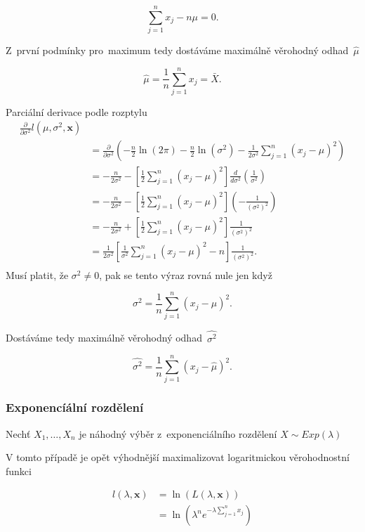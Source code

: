 \documentclass[thesis=B,czech]{FITthesis}[2012/06/26]
\begin{document}
$$\sum^{n}_{j=1}x_{j}-n\mu = 0.$$

\noindent Z~první podmínky pro~maximum tedy dostáváme maximálně věrohodný odhad~$\hat{\mu}$

$$\hat{\mu}=\frac{1}{n}\sum^n_{j=1}x_{j}=\bar{X}.$$

\noindent Parciální derivace podle rozptylu
\begin{align*}
\frac{\partial }{\partial \sigma^2}l(\mu,\sigma^2,\boldsymbol{x})\\
&=\frac{\partial }{\partial \sigma^2}
(-\frac{n}{2}\ln(2\pi)-\frac{n}{2}\ln(\sigma^2)-\frac{1}{2\sigma^2}
\sum^{n}_{j=1}(x_{j}-\mu)^2)\\
&= -\frac{n}{2\sigma^2}- \left [ \frac{1}{2}\sum^{n}_{j=1}(x_{j}-\mu)^2 \right ] \frac{d}{d \sigma^2} \left (\frac{1}{\sigma^2} \right )\\
&= -\frac{n}{2\sigma^2}- \left [ \frac{1}{2}\sum^{n}_{j=1}(x_{j}-\mu)^2 \right ] \left (- \frac{1}{(\sigma^2)^2} \right )\\
&=-\frac{n}{2\sigma^2}+
\left [ \frac{1}{2}\sum^{n}_{j=1}(x_{j}-\mu)^2 \right ]
\frac{1}{(\sigma^2)^2}\\
&=\frac{1}{2\sigma^2}
\left [ \frac{1}{\sigma^2}\sum^{n}_{j=1}(x_{j}-\mu)^2-n \right ]
\frac{1}{(\sigma^2)^2}.\\
\end{align*}
\noindent Musí platit, že $\sigma^2\neq0$, pak se tento výraz rovná nule jen když

$$\sigma^2=\frac{1}{n}\sum^{n}_{j=1}(x_{j}-\mu)^2.$$

\noindent Dostáváme tedy maximálně věrohodný odhad~$\hat{\sigma^2}$

$$\hat{\sigma^2}=\frac{1}{n}\sum^{n}_{j=1}(x_{j}-\hat{\mu})^2.$$

\subsubsection{Exponencíální rozdělení}
Nechť $X_1,\dotsc,X_n$ je náhodný výběr z~exponenciálního rozdělení $X \sim Exp(\lambda)$ 

V tomto případě je opět výhodnější maximalizovat logaritmickou věrohodnostní funkci

\begin{align*}
l(\lambda,\boldsymbol{x}) 
& = \ln(L(\lambda,\boldsymbol{x})) \\
& = \ln (\lambda^n e^{-\lambda \sum^{n}_{j=1}x_{j}}) \\
\end{align*}
\end{document}
